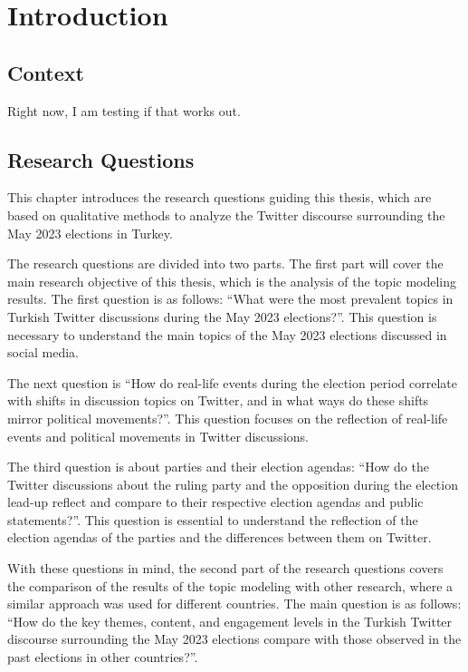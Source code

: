 
\chapter{Introduction}\label{chapter:introduction}

\section{Context}

Right now, I am testing if that works out.

\section{Research Questions}

This chapter introduces the research questions guiding this thesis,
which are based on qualitative methods to analyze the Twitter discourse surrounding the May 2023 elections in Turkey.


The research questions are divided into two parts.
The first part will cover the main research objective of this thesis, 
which is the analysis of the topic modeling results. The first question is as follows:
``What were the most prevalent topics in Turkish Twitter discussions during the May 2023 elections?''.
This question is necessary to understand the main topics of the May 2023 elections discussed in social media.

The next question is ``How do real-life events during the election period correlate with shifts in discussion topics on Twitter, 
and in what ways do these shifts mirror political movements?''.
This question focuses on the reflection of real-life events and political movements in Twitter discussions. 

The third question is about parties and their election agendas: 
``How do the Twitter discussions about the ruling party and the opposition during the election lead-up reflect and compare 
to their respective election agendas and public statements?''.
This question is essential to understand the reflection of the election agendas of the parties and the differences between them on Twitter.

With these questions in mind, the second part of the research questions covers the comparison of the results of the topic modeling
with other research, where a similar approach was used for different countries.
The main question is as follows: 
``How do the key themes, content, and engagement levels in the Turkish Twitter discourse surrounding the May 2023 elections
 compare with those observed in the past elections in other countries?''.
